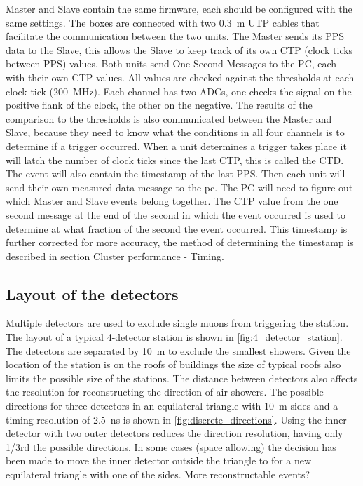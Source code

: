 Master and Slave contain the same firmware, each should be configured with the same settings. The boxes are connected with two \SI{0.3}{\meter} UTP cables that facilitate the communication between the two units. The Master sends its PPS data to the Slave, this allows the Slave to keep track of its own CTP (clock ticks between PPS) values. Both units send One Second Messages to the PC, each with their own CTP values. All \adc values are checked against the thresholds at each clock tick (\SI{200}{\mega\hertz}). Each channel has two ADCs, one checks the signal on the positive flank of the clock, the other on the negative. The results of the comparison to the thresholds is also communicated between the Master and Slave, because they need to know what the conditions in all four channels is to determine if a trigger occurred. When a unit determines a trigger takes place it will latch the number of clock ticks since the last CTP, this is called the CTD. The event will also contain the timestamp of the last PPS. Then each unit will send their own measured data message to the pc. The PC will need to figure out which Master and Slave events belong together. The CTP value from the one second message at the end of the second in which the event occurred is used to determine at what fraction of the second the event occurred. This timestamp is further corrected for more accuracy, the method of determining the \gps timestamp is described in section Cluster performance - Timing.


\subsection{Layout of the detectors}

Multiple detectors are used to exclude single muons from triggering the station. The layout of a  typical 4-detector station is shown in \cref{fig:4_detector_station}. The detectors are separated by \SI{10}{\meter} to exclude the smallest showers. Given the location of the station is on the roofs of buildings the size of typical roofs also limits the possible size of the stations. The distance between detectors also affects the resolution for reconstructing the direction of air showers. The possible directions for three detectors in an equilateral triangle with \SI{10}{\meter} sides and a timing resolution of \SI{2.5}{\ns} is shown in \cref{fig:discrete_directions}. Using the inner detector with two outer detectors reduces the direction resolution, having only 1/3rd the possible directions. In some cases (space allowing) the decision has been made to move the inner detector outside the triangle to for a new equilateral triangle with one of the sides. More reconstructable events?


